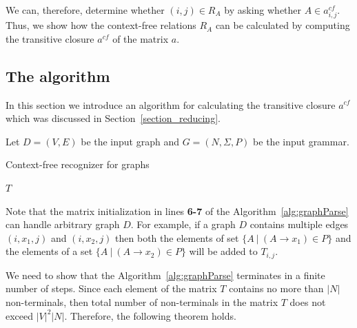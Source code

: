 We can, therefore, determine whether $(i,j) \in R_A$ by asking whether $A \in a^{cf}_{i,j}$. Thus, we show how the context-free relations $R_A$ can be calculated by computing the transitive closure $a^{cf}$ of the matrix $a$.



\subsection{The algorithm} \label{section_algorithm}
In this section we introduce an algorithm for calculating the transitive closure $a^{cf}$ which was discussed in Section~\ref{section_reducing}.

Let $D = (V, E)$ be the input graph and $G = (N,\Sigma,P)$ be the input grammar.

\begin{algorithm}[H]
\begin{algorithmic}[1]
\caption{Context-free recognizer for graphs}
\label{alg:graphParse}
    
    \EndFor    
       
    \EndWhile
\State \Return $T$
\EndFunction
\end{algorithmic}
\end{algorithm}

Note that the matrix initialization in lines \textbf{6-7} of the Algorithm~\ref{alg:graphParse} can handle arbitrary graph $D$. For example, if a graph $D$ contains multiple edges $(i,x_1,j)$ and $(i,x_2,j)$ then both the elements of set $\{A~|~(A \rightarrow x_1) \in P \}$ and the elements of a set $\{A~|~(A \rightarrow x_2) \in P \}$ will be added to $T_{i,j}$.

We need to show that the Algorithm~\ref{alg:graphParse} terminates in a finite number of steps. Since each element of the matrix $T$ contains no more than $|N|$ non-terminals, then total number of non-terminals in the matrix $T$ does not exceed $|V|^2|N|$. Therefore, the following theorem holds.

